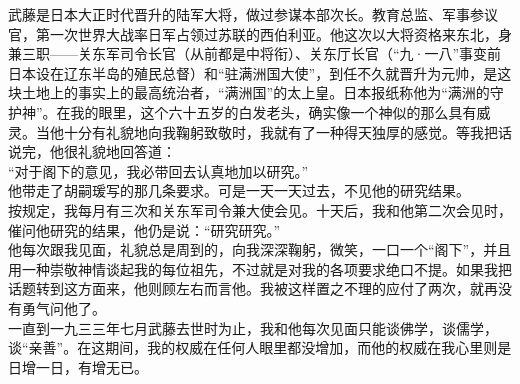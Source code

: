 武藤是日本大正时代晋升的陆军大将，做过参谋本部次长。教育总监、军事参议官，第一次世界大战率日军占领过苏联的西伯利亚。他这次以大将资格来东北，身兼三职——关东军司令长官（从前都是中将衔）、关东厅长官（“九·一八”事变前日本设在辽东半岛的殖民总督）和“驻满洲国大使”，到任不久就晋升为元帅，是这块土地上的事实上的最高统治者，“满洲国”的太上皇。日本报纸称他为“满洲的守护神”。在我的眼里，这个六十五岁的白发老头，确实像一个神似的那么具有威灵。当他十分有礼貌地向我鞠躬致敬时，我就有了一种得天独厚的感觉。等我把话说完，他很礼貌地回答道：\\

“对于阁下的意见，我必带回去认真地加以研究。”\\

他带走了胡嗣瑗写的那几条要求。可是一天一天过去，不见他的研究结果。\\

按规定，我每月有三次和关东军司令兼大使会见。十天后，我和他第二次会见时，催问他研究的结果，他仍是说：“研究研究。”\\

他每次跟我见面，礼貌总是周到的，向我深深鞠躬，微笑，一口一个“阁下”，并且用一种崇敬神情谈起我的每位祖先，不过就是对我的各项要求绝口不提。如果我把话题转到这方面来，他则顾左右而言他。我被这样置之不理的应付了两次，就再没有勇气问他了。\\

一直到一九三三年七月武藤去世时为止，我和他每次见面只能谈佛学，谈儒学，谈“亲善”。在这期间，我的权威在任何人眼里都没增加，而他的权威在我心里则是日增一日，有增无已。\\